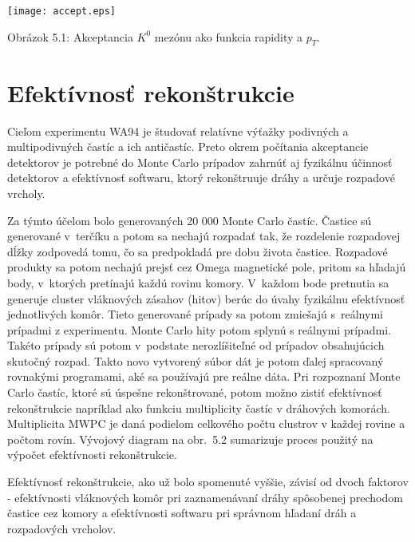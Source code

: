 \begin{center}
  \texttt{[image: accept.eps]}
\end{center}
\begin{center}
  Obrázok 5.1: Akceptancia $K^{0}$ mezónu ako funkcia rapidity a $p_{T}$.
\end{center}

\newpage
\section{Efektívnosť rekonštrukcie}
Cieľom experimentu WA94
je študovať relatívne výťažky podivných a multipodivných častíc a ich
antičastíc. Preto okrem počítania akceptancie detektorov je potrebné do
Monte Carlo prípadov zahrnúť aj fyzikálnu účinnosť detektorov
a efektívnosť softwaru, ktorý rekonštruuje dráhy a
určuje rozpadové vrcholy.

Za týmto účelom bolo generovaných 20 000 Monte Carlo častíc. Častice
sú  generované v~terčíku a potom sa nechajú rozpadať tak, že rozdelenie
rozpadovej dĺžky zodpovedá tomu, čo sa predpokladá pre
dobu života častice. Rozpadové produkty sa potom  nechajú prejsť cez Omega
magnetické pole, pritom sa  hľadajú body, v~ktorých pretínajú každú rovinu
komory. V~každom bode pretnutia sa generuje cluster vláknových zásahov
(hitov) berúc do úvahy fyzikálnu efektívnosť jednotlivých komôr. Tieto
generované prípady sa potom zmiešajú s~reálnymi prípadmi z experimentu. Monte
Carlo hity potom splynú s reálnymi prípadmi. Takéto prípady sú potom
v~podstate nerozlíšiteľné od prípadov obsahujúcich skutočný rozpad. Takto
novo vytvorený súbor dát je  potom ďalej spracovaný rovnakými programami, aké
sa používajú pre reálne dáta.  Pri rozpoznaní Monte Carlo častíc, ktoré sú
úspešne rekonštrované, potom možno zistiť efektívnosť rekonštrukcie
napríklad ako  funkciu multiplicity  častíc v dráhových komorách.
Multiplicita MWPC je daná podielom celkového počtu clustrov v každej rovine a
počtom rovín. Vývojový diagram na obr.~5.2
sumarizuje proces použitý na výpočet efektívnosti rekonštrukcie.

Efektívnosť rekonštrukcie, ako už bolo spomenuté vyššie, závisí od dvoch
faktorov - efektívnosti vláknových komôr pri zaznamenávaní dráhy spôsobenej
prechodom častice cez komory a efektívnosti softwaru pri správnom hľadaní
dráh a rozpadových vrcholov.

